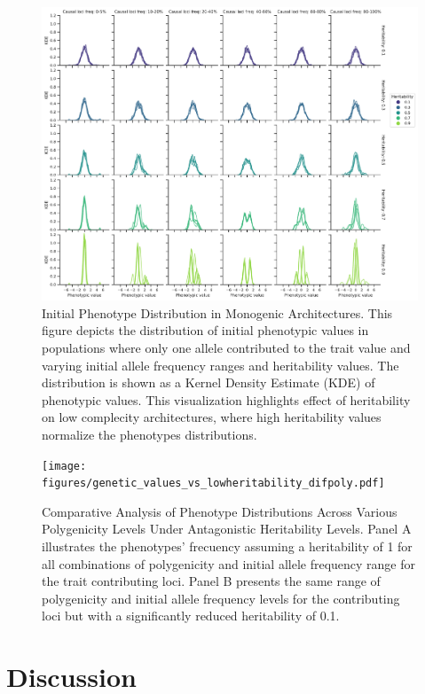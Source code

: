 \documentclass{article}
\begin{document}
\begin{figure}[b]
    \centering
    \includegraphics[width=1\textwidth]{figures/phenotypes_initial_onlymonogenic-2.pdf}
    \caption{ Initial Phenotype Distribution in Monogenic Architectures. This figure depicts the distribution of initial phenotypic values in populations where only one allele contributed to the trait value and varying initial allele frequency ranges and heritability values. The distribution is shown as a Kernel Density Estimate (KDE) of phenotypic values. This visualization highlights effect of heritability on low complecity architectures, where high heritability values normalize the phenotypes distributions.}
    \label{fig:phenotypes_initial_mono}
\end{figure}

\begin{figure}[b]
    \centering
    \texttt{[image: figures/genetic\_values\_vs\_lowheritability\_difpoly.pdf]}
    \caption{Comparative Analysis of Phenotype Distributions Across Various Polygenicity Levels Under Antagonistic Heritability Levels. Panel A illustrates the phenotypes' frecuency assuming a heritability of 1 for all combinations of polygenicity and initial allele frequency range for the trait contributing loci. Panel B presents the same range of polygenicity and initial allele frequency levels for the contributing loci but with a significantly reduced heritability of 0.1.}
    \label{fig:genetic_values_vs_lowheritability_difpoly}
\end{figure}


\section{Discussion}
\end{document}
